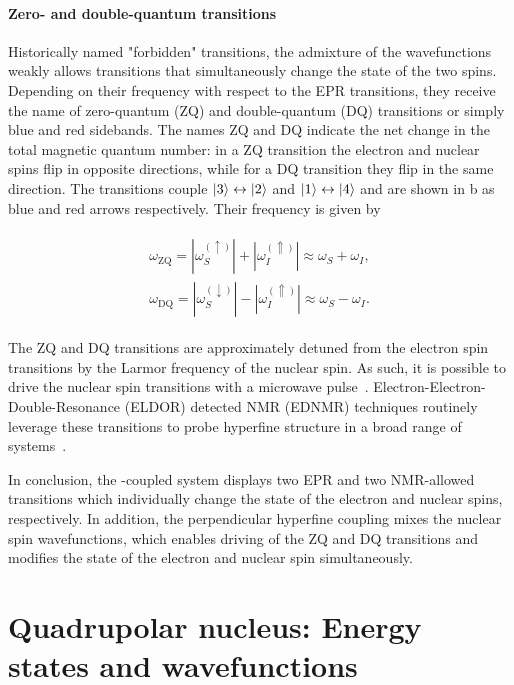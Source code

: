 \paragraph{Zero- and double-quantum transitions} Historically named "forbidden" transitions, the admixture of the wavefunctions weakly allows transitions that simultaneously change the state of the two spins. Depending on their frequency with respect to the EPR transitions, they receive the name of zero-quantum (ZQ) and double-quantum (DQ) transitions or simply blue and red sidebands. The names ZQ and DQ indicate the net change in the total magnetic quantum number: in a ZQ transition the electron and nuclear spins flip in opposite directions, while for a DQ transition they flip in the same direction. The transitions couple $\ket{3} \leftrightarrow \ket{2}$ and $\ket{1} \leftrightarrow \ket{4}$ and are shown in b as blue and red arrows respectively. Their frequency is given by

\begin{align}
\begin{split}
    \omega_\text{ZQ} = |\omega_S^{(\uparrow)}|   + |\omega_I^{(\Uparrow)}| \approx \omega_S + \omega_I, \\
    \omega_\text{DQ} = |\omega_S^{(\downarrow)}| - |\omega_I^{(\Uparrow)}| \approx \omega_S - \omega_I.
\end{split}
\end{align} 

The ZQ and DQ transitions are approximately detuned from the electron spin transitions by the Larmor frequency of the nuclear spin. As such, it is possible to drive the nuclear spin transitions with a microwave pulse~. Electron-Electron-Double-Resonance (ELDOR) detected NMR (EDNMR) techniques routinely leverage these transitions to probe hyperfine structure in a broad range of systems~.

In conclusion, the \W-\Er coupled system displays two EPR and two NMR-allowed transitions which individually change the state of the electron and nuclear spins, respectively. In addition, the perpendicular hyperfine coupling mixes the nuclear spin wavefunctions, which enables driving of the ZQ and DQ transitions and modifies the state of the electron and nuclear spin simultaneously.

\section[Quadrupolar spins]{Quadrupolar nucleus: Energy states and wavefunctions}



